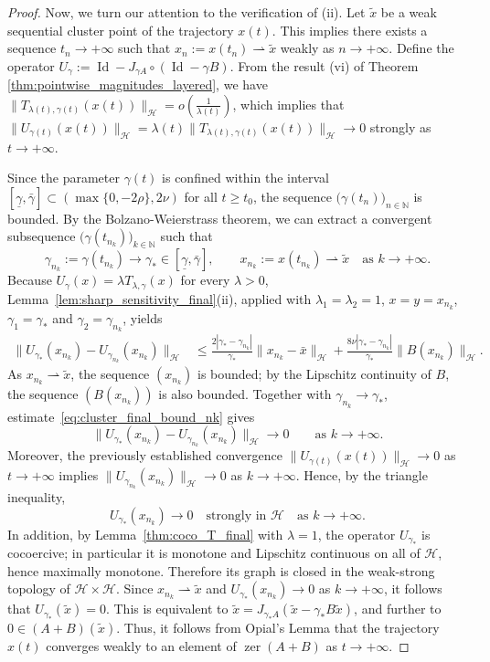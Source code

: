 \documentclass{article}
\theoremstyle{definition}
\theoremstyle{definition}
\theoremstyle{definition}
\begin{document}
\begin{proof}
Now, we turn our attention to the verification of (ii). Let $\tilde{x}$ be a weak sequential cluster point of the trajectory $x(t)$. This implies there exists a sequence $t_n \to +\infty$ such that $x_n := x(t_n) \rightharpoonup \tilde{x}$ weakly as $n \to +\infty$. Define the operator $U_{\gamma} := \operatorname{Id} - J_{\gamma A} \circ (\operatorname{Id} - \gamma B)$. From the result (vi) of Theorem \ref{thm:pointwise_magnitudes_layered}, we have $\|T_{\lambda(t), \gamma(t)}(x(t))\|_{\mathcal{H}} = o(\frac{1}{\lambda(t)})$, which implies that $\|U_{\gamma(t)}(x(t))\|_{\mathcal{H}} = \lambda(t) \|T_{\lambda(t), \gamma(t)}(x(t))\|_{\mathcal{H}} \to 0$ strongly as $t \to +\infty$.

\noindent Since the parameter $\gamma(t)$ is confined within the interval $[\underline{\gamma}, \bar{\gamma}] \subset \left( \max\{0, -2\rho\}, 2\nu \right)$ for all $t \ge t_0$, the sequence $\big( \gamma(t_n) \big)_{n \in \mathbb{N}}$ is bounded. By the Bolzano-Weierstrass theorem, we can extract a convergent subsequence $\big( \gamma(t_{n_k}) \big)_{k \in \mathbb{N}}$ such that
\[
\gamma_{n_k}:=\gamma(t_{n_k})\to\gamma_*\in[\underline{\gamma},\bar{\gamma}],
\qquad x_{n_k}:=x(t_{n_k})\rightharpoonup\tilde{x}
\quad\text{as }k\to+\infty.
\]
Because $U_{\gamma}(x)=\lambda T_{\lambda,\gamma}(x)$ for every $\lambda>0$, Lemma~\ref{lem:sharp_sensitivity_final}(ii), applied with $\lambda_1=\lambda_2=1$, $x=y=x_{n_k}$, $\gamma_1=\gamma_*$ and $\gamma_2=\gamma_{n_k}$, yields
\begin{align}
\|U_{\gamma_*}(x_{n_k})-U_{\gamma_{n_k}}(x_{n_k})\|_{\mathcal{H}}
&\le \frac{2|\gamma_*-\gamma_{n_k}|}{\gamma_*}\|x_{n_k}-\bar{x}\|_{\mathcal{H}}
 +\frac{8\nu|\gamma_*-\gamma_{n_k}|}{\gamma_*}\|B(x_{n_k})\|_{\mathcal{H}}. \label{eq:cluster_final_bound_nk}
\end{align}
As $x_{n_k}\rightharpoonup\tilde{x}$, the sequence $(x_{n_k})$ is bounded; by the Lipschitz continuity of $B$, the sequence $(B(x_{n_k}))$ is also bounded. Together with $\gamma_{n_k}\to\gamma_*$, estimate~\eqref{eq:cluster_final_bound_nk} gives
\[
\|U_{\gamma_*}(x_{n_k})-U_{\gamma_{n_k}}(x_{n_k})\|_{\mathcal{H}}\to0
\qquad \text{as } k\to+\infty.
\]
Moreover, the previously established convergence $\|U_{\gamma(t)}(x(t))\|_{\mathcal{H}}\to0$ as $t\to+\infty$ implies $\|U_{\gamma_{n_k}}(x_{n_k})\|_{\mathcal{H}}\to0$ as $k\to+\infty$. Hence, by the triangle inequality,
\[
U_{\gamma_*}(x_{n_k})\to0
\quad\text{strongly in }\mathcal{H}\quad\text{as }k\to+\infty.
\]
In addition, by Lemma~\ref{thm:coco_T_final} with $\lambda=1$, the operator $U_{\gamma_*}$ is cocoercive; in particular it is monotone and Lipschitz continuous on all of $\mathcal{H}$, hence maximally monotone. Therefore its graph is closed in the weak-strong topology of $\mathcal{H}\times\mathcal{H}$. Since $x_{n_k}\rightharpoonup\tilde{x}$ and $U_{\gamma_*}(x_{n_k})\to0$ as $k\to+\infty$, it follows that $U_{\gamma_*}(\tilde{x})=0$. This is equivalent to $\tilde{x}=J_{\gamma_* A}(\tilde{x}-\gamma_*B\tilde{x})$, and further to $0\in(A+B)(\tilde{x})$. Thus, it follows from Opial's Lemma that the trajectory $x(t)$ converges weakly to an element of $\operatorname{zer}(A+B)$ as $t \to +\infty$.
\end{proof}
\end{document}
